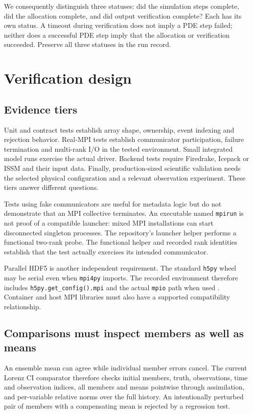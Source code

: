 \documentclass[11pt,a4paper]{article}
\newcommand{\code}[1]{\nolinkurl{#1}}
\begin{document}
We consequently distinguish three statuses: did the simulation steps complete, did the allocation complete, and did output verification complete? Each has its own status. A timeout during verification does not imply a PDE step failed; neither does a successful PDE step imply that the allocation or verification succeeded. Preserve all three statuses in the run record.

\section{Verification design}
\subsection{Evidence tiers}
Unit and contract tests establish array shape, ownership, event indexing and rejection behavior. Real-MPI tests establish communicator participation, failure termination and multi-rank I/O in the tested environment. Small integrated model runs exercise the actual driver. Backend tests require Firedrake, Icepack or ISSM and their input data. Finally, production-sized scientific validation needs the selected physical configuration and a relevant observation experiment. These tiers answer different questions.

Tests using fake communicators are useful for metadata logic but do not demonstrate that an MPI collective terminates. An executable named \code{mpirun} is not proof of a compatible launcher: mixed MPI installations can start disconnected singleton processes. The repository's launcher helper performs a functional two-rank probe. The functional helper and recorded rank identities establish that the test actually exercises its intended communicator.

Parallel HDF5 is another independent requirement. The standard \code{h5py} wheel may be serial even when \code{mpi4py} imports. The recorded environment therefore includes \code{h5py.get_config().mpi} and the actual \code{mpio} path when used \citep{h5pympi}. Container and host MPI libraries must also have a supported compatibility relationship.

\subsection{Comparisons must inspect members as well as means}
An ensemble mean can agree while individual member errors cancel. The current Lorenz CI comparator therefore checks initial members, truth, observations, time and observation indices, all members and means pointwise through assimilation, and per-variable relative norms over the full history. An intentionally perturbed pair of members with a compensating mean is rejected by a regression test.
\end{document}

